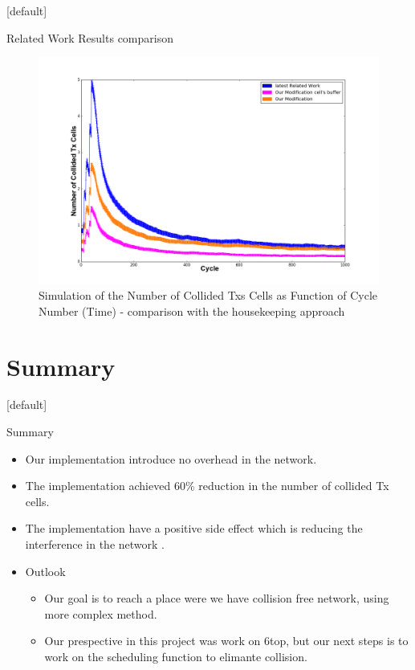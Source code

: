 \documentclass{beamer}
\makeatletter
\newenvironment{withoutheadline}{
        \setbeamertemplate{headline}[default]
        \def\beamer@entrycode{\vspace*{-\headheight}}
    }{}
\makeatother
\begin{document}
\begin{withoutheadline}
\begin{frame}{Related Work Results comparison}

\begin{figure}[p]

\includegraphics[width=0.95\linewidth]{oie_tsvdkqnj4zdz.png}
\caption{Simulation of the Number of Collided Txs Cells as Function of Cycle Number (Time) - comparison with the housekeeping approach }
\end{figure}



\end{frame}
\end{withoutheadline}

\section*{Summary}
\begin{withoutheadline}
\begin{frame}{Summary}
  \begin{itemize}
  \item
    Our implementation introduce  \alert{no overhead } in the network.
  \item
    The implementation \alert{achieved 60\% reduction} in the number of collided Tx cells.
  \item
    The implementation have a positive side effect which is \alert{reducing the interference in the network }.
  \end{itemize}
  
  \begin{itemize}
  \item
    Outlook
    \begin{itemize}
    \item
     Our goal is to reach a place were we have collision free network, using more complex method.
    \item
      Our prespective in this project was work on 6top, but our next steps is to work on the scheduling function to elimante collision.
    \end{itemize}
  \end{itemize}
\end{frame}
\end{withoutheadline}
\end{document}
